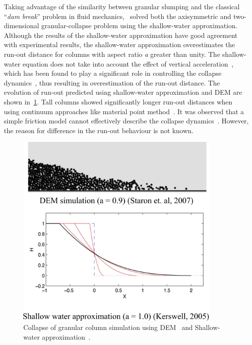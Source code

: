 Taking advantage 
of the similarity between granular slumping and the classical ``\textit{dam 
break}'' problem in fluid mechanics,~\citet{Kerswell2005} solved both the 
axisymmetric and two-dimensional granular-collapse problem using the 
shallow-water approximation. Although the results of the shallow-water 
approximation have good agreement with experimental results, the shallow-water 
approximation overestimates the run-out distance for columns with aspect ratio 
\textit{a} greater than unity. The shallow-water equation does not take into 
account the effect of vertical acceleration~\citep{Lajeunesse2005}, which has 
been found to play a significant role in controlling the collapse 
dynamics~\citep{Staron2007a}, thus resulting in overestimation of the run-out 
distance. The evolution of run-out predicted using shallow-water approximation 
and DEM are shown in~\cref{fig:DEM_Shallow}. Tall 
columns showed significantly longer run-out distances when using continuum 
approaches like material point method~\citep{Bandara2013,Mast2014}. It was 
observed that a simple friction model cannot effectively describe the collapse 
dynamics~\citep{Staron2007a}. However, the reason for difference in the run-out 
behaviour is not known. 

\begin{figure}
\centering
\includegraphics[width=0.9\textwidth]{DEM_Shallow}
\caption[Collapse of granular column simulation using DEM
and Shallow-water approximation]{Collapse of granular column simulation using 
DEM~\citep{Staron2007a} and Shallow-water approximation~\citep{Kerswell2005}.}
\label{fig:DEM_Shallow}
\end{figure}

